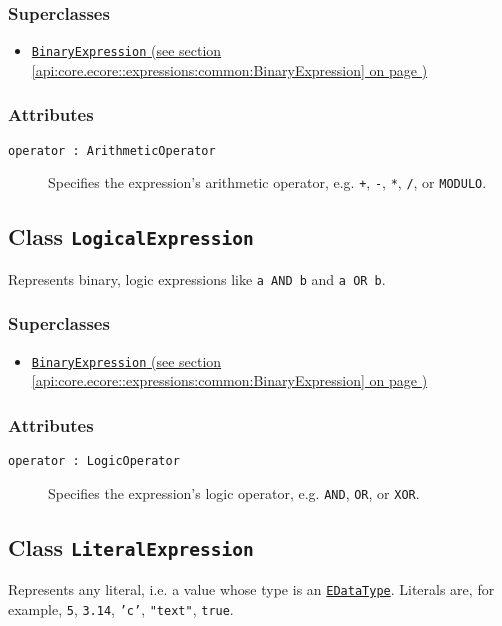 \subsubsection*{Superclasses}
\begin{itemize}
\item \hyperref[api:core.ecore::expressions:common:BinaryExpression]{\texttt{BinaryExpression} (see section \ref*{api:core.ecore::expressions:common:BinaryExpression} on page \pageref*{api:core.ecore::expressions:common:BinaryExpression})}
\end{itemize}
\subsubsection*{Attributes}
\begin{description}
\item[\texttt{operator~:~ArithmeticOperator}] Specifies the expression's arithmetic operator, e.g. \texttt{+}, \texttt{-}, \texttt{*}, \texttt{/}, or \texttt{MODULO}.
\end{description}
\subsection{Class \texttt{LogicalExpression}}
\label{api:core.ecore::expressions:common:LogicalExpression}
Represents binary, logic expressions like \texttt{a AND b} and \texttt{a OR b}.
\subsubsection*{Superclasses}
\begin{itemize}
\item \hyperref[api:core.ecore::expressions:common:BinaryExpression]{\texttt{BinaryExpression} (see section \ref*{api:core.ecore::expressions:common:BinaryExpression} on page \pageref*{api:core.ecore::expressions:common:BinaryExpression})}
\end{itemize}
\subsubsection*{Attributes}
\begin{description}
\item[\texttt{operator~:~LogicOperator}] Specifies the expression's logic operator, e.g. \texttt{AND}, \texttt{OR}, or \texttt{XOR}.
\end{description}
\subsection{Class \texttt{LiteralExpression}}
\label{api:core.ecore::expressions:common:LiteralExpression}
Represents any literal, i.e. a value whose type is an \hyperref[EDataType]{\texttt{EDataType}}. Literals are, for example, \texttt{5}, \texttt{3.14}, \texttt{'c'}, \texttt{"text"}, \texttt{true}.
